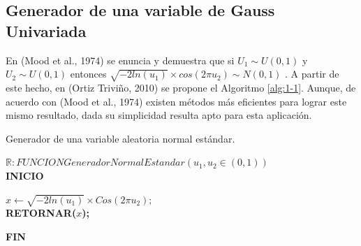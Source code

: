 \subsection{Generador de una variable de Gauss Univariada}
En (Mood et al., 1974) se enuncia y demuestra que si $U_1\sim U\left(0,1\right)$  y $U_2\sim U\left(0,1\right)$ entonces $\sqrt{-2ln{\left(u_1\right)}}\times c o s{\left(2\pi u_2\right)}\sim N\left(0,1\right)$ .  A partir de este hecho, en (Ortiz Triviño, 2010) se propone  el Algoritmo \ref{alg:1-1}.  Aunque, de acuerdo con (Mood et al., 1974) existen métodos más eficientes para lograr este mismo resultado, dada su simplicidad resulta apto para esta aplicación.
\begin{algorithm} 
            \caption{Generador de una variable aleatoria normal estándar.}
            \label{alg:1-1}
            \begin{flushleft}
            \textbf{$\mathbb{R}:FUNCIONGeneradorNormalEstandar(u_1,u_2\in(0,1))$}\\
                \textbf{INICIO}\\
                \end{flushleft}
                \begin{algorithmic}
                \State$x\gets\sqrt{-2ln{(u_1)}}\times Cos(2\pi u_2);$    \\
                
                \textbf{RETORNAR($x$);}\\
                \end{algorithmic}
                
                
                \begin{flushleft}
                \textbf{FIN}\\
                \end{flushleft}
                
            
            
        \end{algorithm} 

